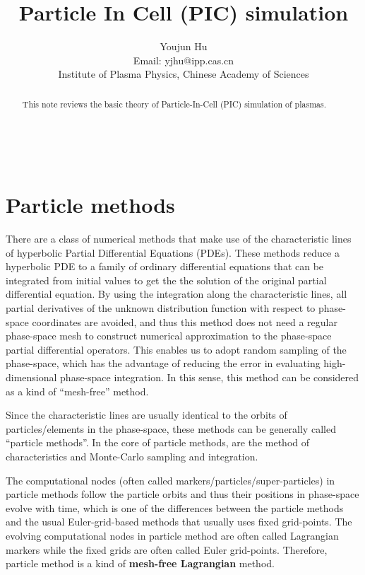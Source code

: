 \documentclass{article}
\newcommand{\tmaffiliation}[1]{\\ #1}
\newcommand{\tmstrong}[1]{\textbf{#1}}
\begin{document}
\title{Particle In Cell (PIC) simulation}

\author{
  Youjun Hu
  \tmaffiliation{Email: yjhu@ipp.cas.cn\\
  Institute of Plasma Physics, Chinese Academy of Sciences}
}

\maketitle

\begin{abstract}
  This note reviews the basic theory of Particle-In-Cell (PIC) simulation of
  plasmas.
\end{abstract}

\

\section{Particle methods}

There are a class of numerical methods that make use of the characteristic
lines of hyperbolic Partial Differential Equations (PDEs). These methods
reduce a hyperbolic PDE to a family of ordinary differential equations that
can be integrated from initial values to get the the solution of the original
partial differential equation. By using the integration along the
characteristic lines, all partial derivatives of the unknown distribution
function with respect to phase-space coordinates are avoided, and thus this
method does not need a regular phase-space mesh to construct numerical
approximation to the phase-space partial differential operators. This enables
us to adopt random sampling of the phase-space, which has the advantage of
reducing the error in evaluating high-dimensional phase-space integration. In
this sense, this method can be considered as a kind of ``mesh-free'' method.

Since the characteristic lines are usually identical to the orbits of
particles/elements in the phase-space, these methods can be generally called
``particle methods''. In the core of particle methods, are the method of
characteristics and Monte-Carlo sampling and integration.

The computational nodes (often called markers/particles/super-particles) in
particle methods follow the particle orbits and thus their positions in
phase-space evolve with time, which is one of the differences between the
particle methods and the usual Euler-grid-based methods that usually uses
fixed grid-points. The evolving computational nodes in particle method are
often called Lagrangian markers while the fixed grids are often called Euler
grid-points. Therefore, particle method is a kind of {\tmstrong{mesh-free
Lagrangian}} method.
\end{document}
